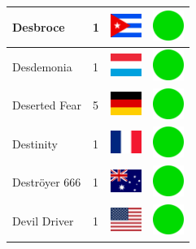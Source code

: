 \documentclass[12pt, a4paper, twoside]{report}
\begin{document}
\begin{center}
\begin{longtable}{|p{5cm}|p{2cm}|p{2cm}|p{2cm}|}
			Desbroce & 1 & \includegraphics[width=1cm]{4x3/cu} & \includegraphics[width=1cm]{likes/y} \\ \hline
			Desdemonia & 1 & \includegraphics[width=1cm]{4x3/lu} & \includegraphics[width=1cm]{likes/y} \\ \hline
			Deserted Fear & 5 & \includegraphics[width=1cm]{4x3/de} & \includegraphics[width=1cm]{likes/y} \\ \hline
			Destinity & 1 & \includegraphics[width=1cm]{4x3/fr} & \includegraphics[width=1cm]{likes/y} \\ \hline
			Deströyer 666 & 1 & \includegraphics[width=1cm]{4x3/au} & \includegraphics[width=1cm]{likes/y} \\ \hline
			Devil Driver & 1 & \includegraphics[width=1cm]{4x3/us} & \includegraphics[width=1cm]{likes/y} \\ \hline

\end{longtable}
\end{center}
\end{document}
